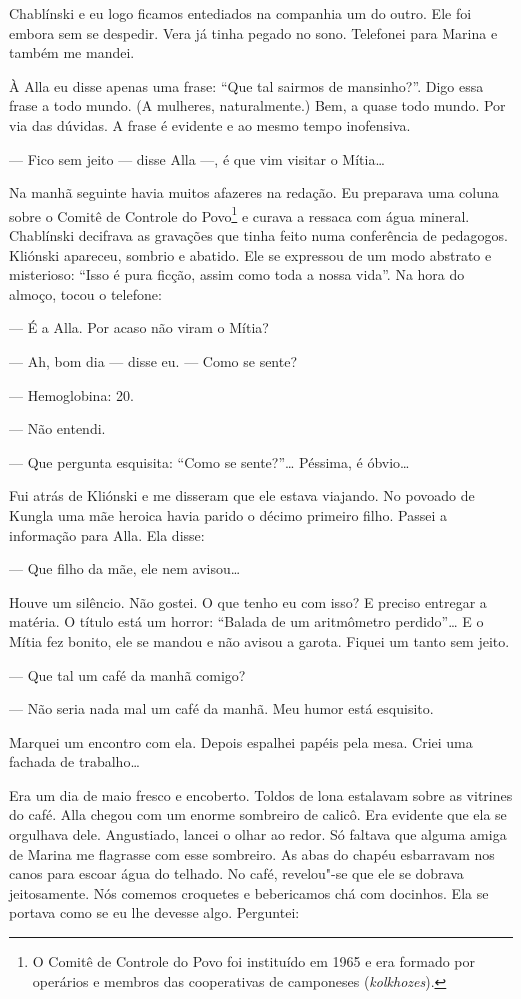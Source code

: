 Chablínski e eu logo ficamos entediados na companhia um do outro. Ele
foi embora sem se despedir. Vera já tinha pegado no sono. Telefonei para
Marina e também me mandei.

À Alla eu disse apenas uma frase: ``Que tal sairmos de mansinho?''. Digo
essa frase a todo mundo. (A mulheres, naturalmente.) Bem, a quase todo
mundo. Por via das dúvidas. A frase é evidente e ao mesmo tempo
inofensiva.

--- Fico sem jeito --- disse Alla ---, é que vim visitar o Mítia\ldots{}

\bigskip

Na manhã seguinte havia muitos afazeres na redação. Eu preparava uma
coluna sobre o Comitê de Controle do Povo\footnote{O Comitê de Controle
  do Povo foi instituído em 1965 e era formado por operários e membros
  das cooperativas de camponeses (\emph{kolkhozes}).} e curava a ressaca
com água mineral. Chablínski decifrava as gravações que tinha feito numa
conferência de pedagogos. Kliónski apareceu, sombrio e abatido. Ele se
expressou de um modo abstrato e misterioso: ``Isso é pura ficção, assim
como toda a nossa vida''. Na hora do almoço, tocou o telefone:

--- É a Alla. Por acaso não viram o Mítia?

--- Ah, bom dia --- disse eu. --- Como se sente?

--- Hemoglobina: 20.

--- Não entendi.

--- Que pergunta esquisita: ``Como se sente?''\ldots{} Péssima, é óbvio\ldots{}

Fui atrás de Kliónski e me disseram que ele estava viajando. No povoado
de Kungla uma mãe heroica havia parido o décimo primeiro filho. Passei a
informação para Alla. Ela disse:

--- Que filho da mãe, ele nem avisou\ldots{}

Houve um silêncio. Não gostei. O que tenho eu com isso? E preciso
entregar a matéria. O título está um horror: ``Balada de um aritmômetro
perdido''\ldots{} E o Mítia fez bonito, ele se mandou e não avisou a garota.
Fiquei um tanto sem jeito.

--- Que tal um café da manhã comigo?

--- Não seria nada mal um café da manhã. Meu humor está esquisito.

Marquei um encontro com ela. Depois espalhei papéis pela mesa. Criei uma
fachada de trabalho\ldots{}

Era um dia de maio fresco e encoberto. Toldos de lona estalavam sobre as
vitrines do café. Alla chegou com um enorme sombreiro de calicô. Era
evidente que ela se orgulhava dele. Angustiado, lancei o olhar ao redor.
Só faltava que alguma amiga de Marina me flagrasse com esse sombreiro.
As abas do chapéu esbarravam nos canos para escoar água do telhado. No
café, revelou"-se que ele se dobrava jeitosamente. Nós comemos croquetes
e bebericamos chá com docinhos. Ela se portava como se eu lhe devesse
algo. Perguntei:

